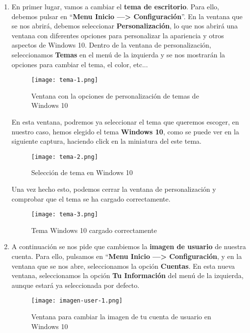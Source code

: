  \begin{enumerate}
    \item En primer lugar, vamos a cambiar el \textbf{tema de escritorio}. Para ello, debemos pulsar en ``\textbf{Menu Inicio ---> Configuración}''. En la ventana que se nos abrirá, debemos seleccionar \textbf{Personalización}, lo que nos abrirá una ventana con diferentes opciones para personalizar la apariencia y otros aspectos de Windows 10. Dentro de la ventana de personalización, seleccionamos \textbf{Temas} en el menú de la izquierda y se nos mostrarán la opciones para cambiar el tema, el color, etc...

    \begin{figure}[H]
        \centering
        \texttt{[image: tema-1.png]}
        \caption{Ventana con la opciones de personalización de temas de Windows 10}
    \end{figure}

    En esta ventana, podremos ya seleccionar el tema que queremos escoger, en nuestro caso, hemos elegido el tema \textbf{Windows 10}, como se puede ver en la siguiente captura, haciendo click en la miniatura del este tema.

    \begin{figure}[H]
        \centering
        \texttt{[image: tema-2.png]}
        \caption{Selección de tema en Windows 10}
    \end{figure}

    Una vez hecho esto, podemos cerrar la ventana de personalización y comprobar que el tema se ha cargado correctamente.

    \begin{figure}[H]
        \centering
        \texttt{[image: tema-3.png]}
        \caption{Tema Windows 10 cargado correctamente}
    \end{figure}

    \item A continuación se nos pide que cambiemos la \textbf{imagen de usuario} de nuestra cuenta. Para ello, pulsamos en ``\textbf{Menu Inicio ---> Configuración}, y en la ventana que se nos abre, seleccionamos la opción \textbf{Cuentas}. En esta nueva ventana, seleccionamos la opción \textbf{Tu Información} del menú de la izquierda, aunque estará ya seleccionada por defecto.

    \begin{figure}[H]
        \centering
        \texttt{[image: imagen-user-1.png]}
        \caption{Ventana para cambiar la imagen de tu cuenta de usuario en Windows 10}
    \end{figure}


\end{enumerate}
